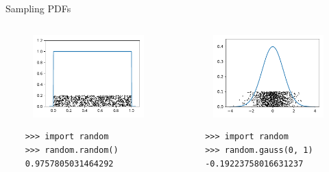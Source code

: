 \documentclass[12pt, aspectratio=149]{beamer}
\theoremstyle{plain}
\begin{document}
\begin{frame}[fragile]{Sampling PDFs}
	\begin{columns}
	\begin{column}{0.5\textwidth}
		\begin{center}
		 \begin{figure}
			 \centering
			 \includegraphics[width=0.99\linewidth]{figures/uniform_samples}
		 \end{figure}
		 \begin{verbatim}
	>>> import random
	>>> random.random()
	0.9757805031464292
		 \end{verbatim}
		 \end{center}
	\end{column}
	\begin{column}{0.5\textwidth}  %
		\begin{center}
		 \begin{figure}
			 \centering
			 \includegraphics[width=0.99\linewidth]{figures/normal_samples}
		 \end{figure}
		  \begin{verbatim}
	>>> import random
	>>> random.gauss(0, 1)
	-0.19223758016631237
		  \end{verbatim}
		 \end{center}
	\end{column}
	\end{columns}
\end{frame}
	
\end{document}
